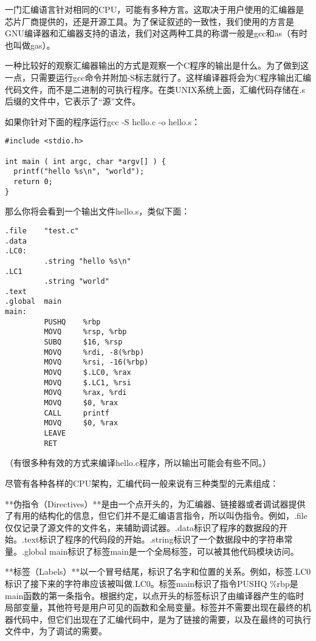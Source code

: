 \documentclass[cn,11pt,chinese]{elegantbook}
\begin{document}
一门汇编语言针对相同的CPU，可能有多种方言。这取决于用户使用的汇编器是芯片厂商提供的，还是开源工具。为了保证叙述的一致性，我们使用的方言是GNU编译器和汇编器支持的语法，我们对这两种工具的称谓一般是gcc和as（有时也叫做gas）。

一种比较好的观察汇编器输出的方式是观察一个C程序的输出是什么。为了做到这一点，只需要运行gcc命令并附加-S标志就行了。这样编译器将会为C程序输出汇编代码文件，而不是二进制的可执行程序。在类UNIX系统上面，汇编代码存储在.s后缀的文件中，它表示了“源”文件。

如果你针对下面的程序运行gcc -S hello.c -o hello.s：

\begin{verbatim}
#include <stdio.h>

int main ( int argc, char *argv[] ) {
  printf("hello %s\n", "world");
  return 0;
}
\end{verbatim}

那么你将会看到一个输出文件hello.s，类似下面：

\begin{verbatim}
.file    "test.c"
.data
.LC0:
         .string "hello %s\n"
.LC1
         .string "world"
.text
.global  main
main:
         PUSHQ    %rbp
         MOVQ     %rsp, %rbp
         SUBQ     $16, %rsp
         MOVQ     %rdi, -8(%rbp)
         MOVQ     %rsi, -16(%rbp)
         MOVQ     $.LC0, %rax
         MOVQ     $.LC1, %rsi
         MOVQ     %rax, %rdi
         MOVQ     $0, %rax
         CALL     printf
         MOVQ     $0, %rax
         LEAVE
         RET
\end{verbatim}

（有很多种有效的方式来编译hello.c程序，所以输出可能会有些不同。）

尽管有各种各样的CPU架构，汇编代码一般来说有三种类型的元素组成：

**伪指令（Directives）**是由一个点开头的，为汇编器、链接器或者调试器提供了有用的结构化的信息，但它们并不是汇编语言指令，所以叫伪指令。例如，.file仅仅记录了源文件的文件名，来辅助调试器。.data标识了程序的数据段的开始。.text标识了程序的代码段的开始。.string标识了一个数据段中的字符串常量。.global main标识了标签main是一个全局标签，可以被其他代码模块访问。

**标签（Labels）**以一个冒号结尾，标识了名字和位置的关系。例如，标签.LC0标识了接下来的字符串应该被叫做.LC0。标签main标识了指令PUSHQ \%rbp是main函数的第一条指令。根据约定，以点开头的标签标识了由编译器产生的临时局部变量，其他符号是用户可见的函数和全局变量。标签并不需要出现在最终的机器代码中，但它们出现在了汇编代码中，是为了链接的需要，以及在最终的可执行文件中，为了调试的需要。
\end{document}
